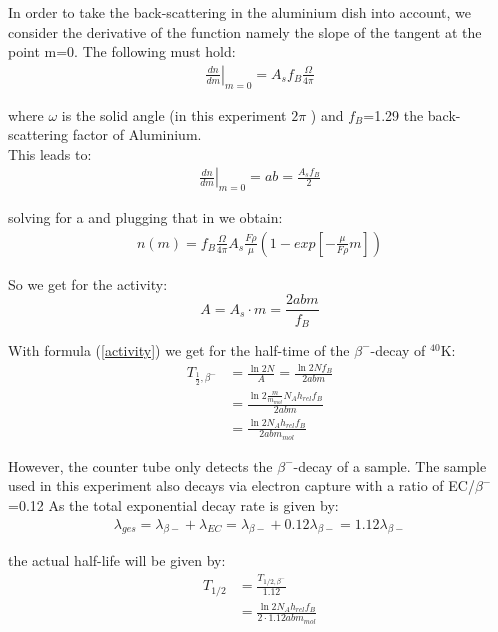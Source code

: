 \documentclass[12pt]{article}
\begin{document}
In order to take the back-scattering in the aluminium dish into account, we consider the derivative of the function namely the slope of the tangent at the point m=0. The following must hold: 
\begin{align}
\left. \frac{dn}{dm}\right| _{m=0}=A_s f_B \frac{\Omega}{4\pi}
\end{align}

where $\omega$ is the solid angle (in this experiment $2\pi$ )  and $f_B$=1.29 the back-scattering factor of Aluminium.\\

This leads to:
\begin{align}
\left. \frac{dn}{dm}\right| _{m=0} = ab = \frac{A_s f_B}{2}
\end{align}


solving for a and plugging that in we obtain:
\begin{align}
n(m) = f_B\frac{\Omega}{4\pi}A_s\frac{F\rho}{\mu}\left( 1-exp\left[ -\frac{\mu}{F\rho}m\right] \right) 
\end{align}


So we get for the activity: $$A=A_s\cdot m=\frac{2abm}{f_B}$$

With formula (\ref{activity}) we get for the half-time of the $\beta^-$-decay of $^{40}$K:
\begin{align}
	T_{\frac12,\beta^-}&=\frac{\ln2N}{A}=\frac{\ln2Nf_B}{2abm}\\&=\frac{\ln2\frac{m}{m_{mol}}N_Ah_{rel}f_B}{2abm}\\&=\frac{\ln2N_Ah_{rel}f_B}{2abm_{mol}}
\end{align}

However, the counter tube only detects the $\beta^-$-decay of a sample. The sample used in this experiment also decays via electron capture with a ratio of EC/$\beta^-$=0.12
As the total exponential decay rate is given by:
\begin{align}
\lambda_{ges} = \lambda_{\beta-} + \lambda_{EC} = \lambda_{\beta-}+0.12\lambda_{\beta-} = 1.12\lambda_{\beta-}
\end{align}

the actual half-life will be given by:
\begin{align}
	T_{1/2} &= \frac{T_{1/2,\beta^-}}{1.12}\\
	&=\frac{\ln2N_Ah_{rel}f_B}{2\cdot1.12abm_{mol}}\label{halftimeKa}
\end{align}

 

 
\end{document}
